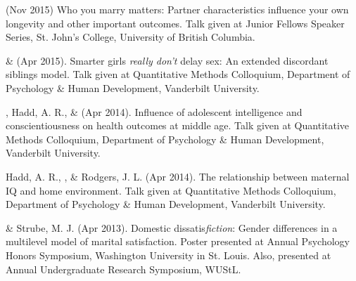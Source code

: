 \item \meb (Nov 2015) Who you marry matters: Partner characteristics influence your own longevity and other important outcomes. Talk given at Junior Fellows Speaker Series, St. John's College, University of British Columbia. \href{https://osf.io/zqv5t/}{\color{blue}{https://osf.io/zqv5t/}}
\item\meb \& \Joe (Apr 2015). Smarter girls \textit{really don't} delay sex: An extended discordant siblings model. Talk given at Quantitative Methods Colloquium, Department of Psychology \& Human Development, Vanderbilt University.
\item\meb, Hadd, A. R., \& \Joe (Apr 2014). Influence of adolescent intelligence and conscientiousness on health outcomes at middle age. Talk given at Quantitative Methods Colloquium, Department of Psychology \& Human Development, Vanderbilt University. 

\item Hadd, A. R., \meb, \& Rodgers, J. L. (Apr 2014). The relationship between maternal IQ and home environment. Talk given at Quantitative Methods Colloquium, Department of Psychology \& Human Development, Vanderbilt University.
\item\meb \& Strube, M. J. (Apr 2013). Domestic dissatis{\em fiction}: Gender differences in a multilevel model of marital satisfaction. Poster presented at Annual Psychology Honors Symposium, Washington University in St. Louis. Also, presented at Annual Undergraduate Research Symposium, WUStL.
\smallskip\\

